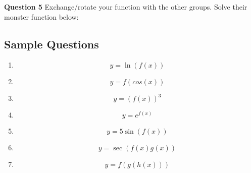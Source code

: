 \documentclass{article}
\begin{document}
\noindent \textbf{Question 5} Exchange/rotate your function with the other groups. Solve their monster function below:

\pagebreak

\subsection{Sample Questions}
\begin{enumerate}
    \item $$y = \ln(f(x))$$
    \item $$y = f(cos(x))$$
    \item $$y = (f(x))^{3}$$
    \item $$y = e^{f(x)}$$
    \item $$y = 5\sin(f(x))$$
    \item $$y = \sec(f(x)g(x))$$
    \item $$y = f(g(h(x)))$$
\end{enumerate}
\end{document}
